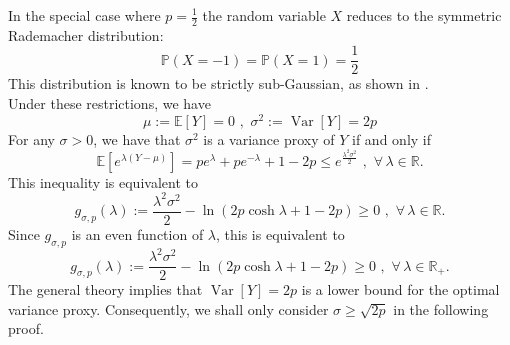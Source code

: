 \documentclass[a4paper, 10pt]{article}
\renewcommand{\P}{\mathbb{P}}
\newcommand{\E}{\mathbb{E}}
\newcommand{\beq}{\begin{equation}}
\newcommand{\eeq}{\end{equation}}
\theoremstyle{definition}
\begin{document}
In the special case where $p=\frac{1}{2}$ the random variable $X$ reduces to the symmetric Rademacher distribution:
\begin{equation}
    \P(X=-1)= \P(X=1)= \frac{1}{2}
\end{equation}
This distribution is known to be strictly sub-Gaussian, as shown in \cite{arbel2020strict}.\\
Under these restrictions, we have
\beq \mu:=\E[Y]=0\,\,,\,\, \sigma^2:=\operatorname{Var}[Y]=2p\eeq
For any $\sigma>0$, we have that $\sigma^2$ is a variance proxy of $Y$ if and only if
\beq \E\left[e^{\lambda (Y-\mu)}\right]=p e^{\lambda }+ pe^{-\lambda } +1-2p\leq e^{\frac{\lambda^2\sigma^2}{2}} \,\, ,\,\, \forall \, \lambda\in \mathbb{R} .\eeq
This inequality is equivalent to
\beq g_{\sigma,p}(\lambda):=\frac{\lambda^2\sigma^2}{2}-\ln( 2p\cosh \lambda +1-2p)\geq 0 \,\,,\,\,  \forall \, \lambda\in \mathbb{R} .\eeq
Since $g_{\sigma,p}$ is an even function of $\lambda$, this is equivalent to 
\beq g_{\sigma,p}(\lambda):=\frac{\lambda^2\sigma^2}{2}-\ln( 2p\cosh \lambda +1-2p)\geq 0 \,\,,\,\,  \forall \, \lambda\in \mathbb{R}_+ .\eeq
The general theory implies that $\operatorname{Var}[Y]=2p$ is a lower bound for the optimal variance proxy. Consequently, we shall only consider $\sigma\geq \sqrt{2p}$ in the following proof.
\medskip
\end{document}

